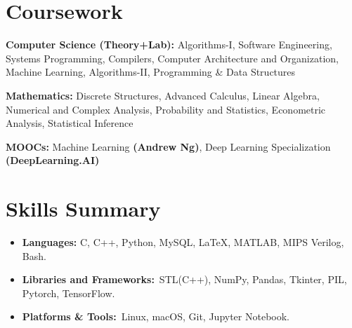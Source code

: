 \documentclass[a4paper,20pt]{article}
\newcommand{\resumeItem}[2]{
  \item\small{
    \textbf{#1}{#2 \vspace{-2pt}}
  }
}
\newcommand{\resumeSubItem}[2]{\resumeItem{#1}{#2}\vspace{-5pt}}
\newcommand{\resumeSubHeadingListStart}{\begin{itemize}[leftmargin=*]}
\newcommand{\resumeSubHeadingListEnd}{\end{itemize}}
\begin{document}
\section{Coursework}
\begin{description}[font=$\bullet$]
  \item {\textbf{Computer Science (Theory+Lab):} Algorithms-I, Software Engineering, Systems Programming, Compilers, Computer Architecture and Organization, Machine Learning, Algorithms-II, Programming \& Data Structures}
  \vspace{-3pt}
  \item {\textbf{Mathematics:} Discrete Structures, Advanced Calculus, Linear Algebra, Numerical and Complex Analysis, Probability and Statistics, Econometric Analysis, Statistical Inference}
  \vspace{-3pt}
  \item {\textbf{MOOCs:} Machine Learning \textbf{(Andrew Ng)}, Deep Learning Specialization \textbf{(DeepLearning.AI)}}
\end{description}



\section{Skills Summary}
\resumeSubHeadingListStart
  \resumeSubItem{Languages: }{C, C++, Python, MySQL, LaTeX, MATLAB, MIPS Verilog, Bash.}
  \resumeSubItem{Libraries and Frameworks:}{~STL(C++), NumPy, Pandas, Tkinter, PIL, Pytorch, TensorFlow.}
  \resumeSubItem{Platforms \& Tools:}{~Linux, macOS, Git, Jupyter Notebook.}
\resumeSubHeadingListEnd
\end{document}
